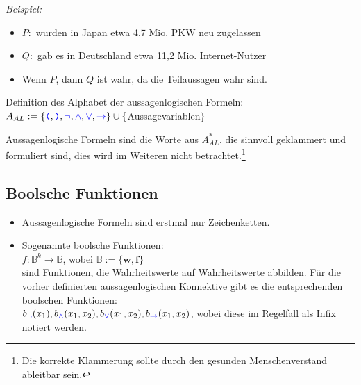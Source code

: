 \documentclass{article}
\newcommand{\blue}[1]{\textcolor{blue}{#1}}
\newcommand{\important}[1]{\textcolor{importantColor}{#1}}
\newcommand{\example}[1]{\textit{Beispiel: }#1}
\newcommand{\word}[1]{\blue{\texttt{#1}}}
\newcommand{\set}[1]{\{#1\}}
\newcommand{\anfuehrung}[1]{\flqq #1\frqq}
\begin{document}
\example
\begin{itemize}
    \item $P:$ \anfuehrung{2014 wurden in Japan etwa 4,7 Mio. PKW neu zugelassen}
    \item $Q:$ \anfuehrung{1999 gab es in Deutschland etwa 11,2 Mio. Internet-Nutzer}
    \item \anfuehrung{Wenn $P$, dann $Q$} ist wahr, da die Teilaussagen wahr sind.
\end{itemize}
Definition des Alphabet der aussagenlogischen Formeln:\\\qquad $A_{AL} := \set{\word{(}, \word{)}, \word{$\lnot$}, \word{$\land$}, \word{$\lor$}, \word{$\rightarrow$}} \cup \set{$Aussagevariablen$}$

Aussagenlogische Formeln sind die Worte aus $A^*_{AL}$, die sinnvoll geklammert und formuliert sind, dies wird im Weiteren nicht betrachtet.\footnote{Die korrekte Klammerung sollte durch den gesunden Menschenverstand ableitbar sein.}

\subsection{Boolsche Funktionen}
\begin{itemize}
    \item Aussagenlogische Formeln sind erstmal nur Zeichenketten.
    \item Sogenannte \important{boolsche Funktionen}:\\
    $f: \mathbb{B}^k \to \mathbb{B}$, \qquad wobei $\mathbb{B}:= \set{\textbf{w}, \textbf{f}}$\\
    sind Funktionen, die Wahrheitswerte auf Wahrheitswerte abbilden. Für die vorher definierten aussagenlogischen Konnektive gibt es die entsprechenden boolschen Funktionen:\\
    $b_{\word{$\lnot$}}(x_1), b_{\word{$\land$}}(x_1, x_2), b_{\word{$\lor$}}(x_1, x_2), b_{\word{$\rightarrow$}}(x_1, x_2)$, wobei diese im Regelfall als Infix notiert werden.
\end{itemize}
\end{document}
